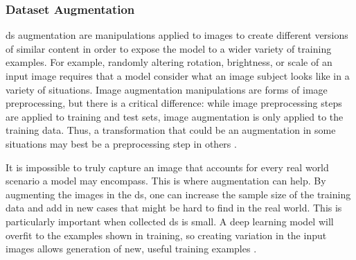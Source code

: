 \subsubsection{Dataset Augmentation}
\gls{ds} augmentation are manipulations applied to images to create different versions of similar content in order to expose the model to a wider variety of training examples. For example, randomly altering rotation, brightness, or scale of an input image requires that a model consider what an image subject looks like in a variety of situations. Image augmentation manipulations are forms of image preprocessing, but there is a critical difference: while image preprocessing steps are applied to training and test sets, image augmentation is only applied to the training data. Thus, a transformation that could be an augmentation in some situations may best be a preprocessing step in others \cite{Preprocessing_Augmentation}.

It is impossible to truly capture an image that accounts for every real world scenario a model may encompass. This is where augmentation can help. By augmenting the images in the \gls{ds}, one can increase the sample size of the training data and add in new cases that might be hard to find in the real world. This is particularly important when collected \gls{ds} is small. A deep learning model will overfit to the examples shown in training, so creating variation in the input images allows generation of new, useful training examples \cite{Preprocessing_Augmentation}.

